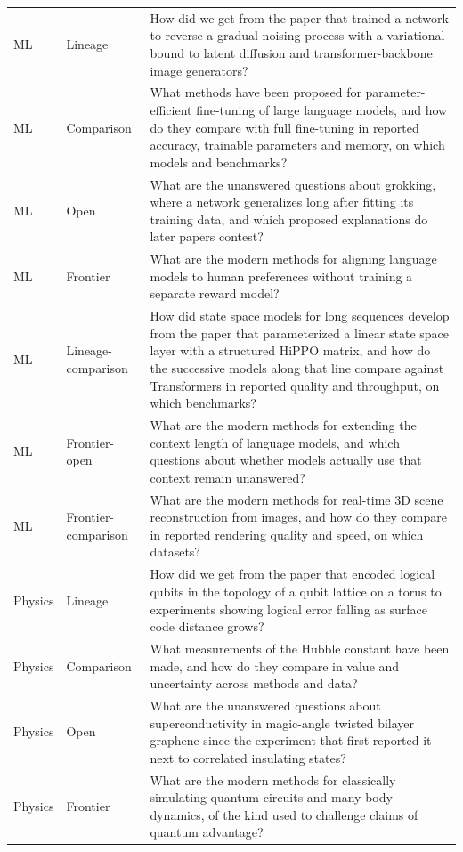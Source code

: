 \begin{table}[H]
\begin{tabular}{llp{}}
ML & Lineage & How did we get from the paper that trained a network to reverse a gradual noising process with a variational bound to latent diffusion and transformer-backbone image generators? \\
ML & Comparison & What methods have been proposed for parameter-efficient fine-tuning of large language models, and how do they compare with full fine-tuning in reported accuracy, trainable parameters and memory, on which models and benchmarks? \\
ML & Open & What are the unanswered questions about grokking, where a network generalizes long after fitting its training data, and which proposed explanations do later papers contest? \\
ML & Frontier & What are the modern methods for aligning language models to human preferences without training a separate reward model? \\
ML & Lineage-comparison & How did state space models for long sequences develop from the paper that parameterized a linear state space layer with a structured HiPPO matrix, and how do the successive models along that line compare against Transformers in reported quality and throughput, on which benchmarks? \\
ML & Frontier-open & What are the modern methods for extending the context length of language models, and which questions about whether models actually use that context remain unanswered? \\
ML & Frontier-comparison & What are the modern methods for real-time 3D scene reconstruction from images, and how do they compare in reported rendering quality and speed, on which datasets? \\
Physics & Lineage & How did we get from the paper that encoded logical qubits in the topology of a qubit lattice on a torus to experiments showing logical error falling as surface code distance grows? \\
Physics & Comparison & What measurements of the Hubble constant have been made, and how do they compare in value and uncertainty across methods and data? \\
Physics & Open & What are the unanswered questions about superconductivity in magic-angle twisted bilayer graphene since the experiment that first reported it next to correlated insulating states? \\
Physics & Frontier & What are the modern methods for classically simulating quantum circuits and many-body dynamics, of the kind used to challenge claims of quantum advantage? \\

\end{tabular}
\end{table}
